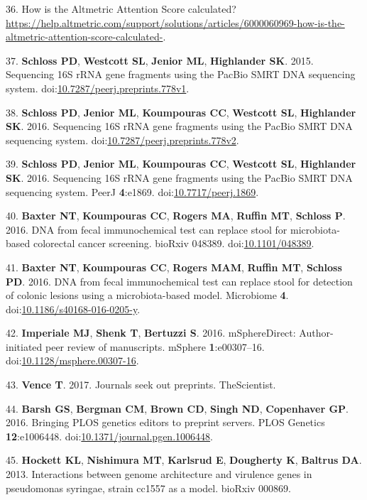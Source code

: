 \documentclass[11pt,]{article}
\begin{document}
\hypertarget{ref-Altmetric}{}
36. How is the Altmetric Attention Score calculated?
\url{https://help.altmetric.com/support/solutions/articles/6000060969-how-is-the-altmetric-attention-score-calculated-}.

\hypertarget{ref-Schloss2015}{}
37. \textbf{Schloss PD}, \textbf{Westcott SL}, \textbf{Jenior ML},
\textbf{Highlander SK}. 2015. Sequencing 16S rRNA gene fragments using
the PacBio SMRT DNA sequencing system.
doi:\href{https://doi.org/10.7287/peerj.preprints.778v1}{10.7287/peerj.preprints.778v1}.

\hypertarget{ref-Schloss2016a}{}
38. \textbf{Schloss PD}, \textbf{Jenior ML}, \textbf{Koumpouras CC},
\textbf{Westcott SL}, \textbf{Highlander SK}. 2016. Sequencing 16S rRNA
gene fragments using the PacBio SMRT DNA sequencing system.
doi:\href{https://doi.org/10.7287/peerj.preprints.778v2}{10.7287/peerj.preprints.778v2}.

\hypertarget{ref-Schloss2016b}{}
39. \textbf{Schloss PD}, \textbf{Jenior ML}, \textbf{Koumpouras CC},
\textbf{Westcott SL}, \textbf{Highlander SK}. 2016. Sequencing 16S rRNA
gene fragments using the PacBio SMRT DNA sequencing system. PeerJ
\textbf{4}:e1869.
doi:\href{https://doi.org/10.7717/peerj.1869}{10.7717/peerj.1869}.

\hypertarget{ref-Baxter2016a}{}
40. \textbf{Baxter NT}, \textbf{Koumpouras CC}, \textbf{Rogers MA},
\textbf{Ruffin MT}, \textbf{Schloss P}. 2016. DNA from fecal
immunochemical test can replace stool for microbiota-based colorectal
cancer screening. bioRxiv 048389.
doi:\href{https://doi.org/10.1101/048389}{10.1101/048389}.

\hypertarget{ref-Baxter2016b}{}
41. \textbf{Baxter NT}, \textbf{Koumpouras CC}, \textbf{Rogers MAM},
\textbf{Ruffin MT}, \textbf{Schloss PD}. 2016. DNA from fecal
immunochemical test can replace stool for detection of colonic lesions
using a microbiota-based model. Microbiome \textbf{4}.
doi:\href{https://doi.org/10.1186/s40168-016-0205-y}{10.1186/s40168-016-0205-y}.

\hypertarget{ref-Imperiale2016}{}
42. \textbf{Imperiale MJ}, \textbf{Shenk T}, \textbf{Bertuzzi S}. 2016.
mSphereDirect: Author-initiated peer review of manuscripts. mSphere
\textbf{1}:e00307--16.
doi:\href{https://doi.org/10.1128/msphere.00307-16}{10.1128/msphere.00307-16}.

\hypertarget{ref-Vence2017}{}
43. \textbf{Vence T}. 2017. Journals seek out preprints. TheScientist.

\hypertarget{ref-Barsh2016}{}
44. \textbf{Barsh GS}, \textbf{Bergman CM}, \textbf{Brown CD},
\textbf{Singh ND}, \textbf{Copenhaver GP}. 2016. Bringing PLOS genetics
editors to preprint servers. PLOS Genetics \textbf{12}:e1006448.
doi:\href{https://doi.org/10.1371/journal.pgen.1006448}{10.1371/journal.pgen.1006448}.

\hypertarget{ref-Hockett2013}{}
45. \textbf{Hockett KL}, \textbf{Nishimura MT}, \textbf{Karlsrud E},
\textbf{Dougherty K}, \textbf{Baltrus DA}. 2013. Interactions between
genome architecture and virulence genes in pseudomonas syringae, strain
cc1557 as a model. bioRxiv 000869.
\end{document}
